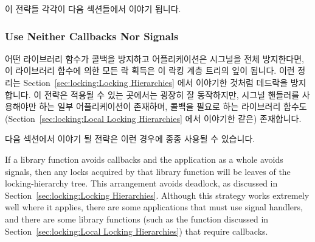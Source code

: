 이 전략들 각각이 다음 섹션들에서 이야기 됩니다.

\subsubsection{Use Neither Callbacks Nor Signals}
\label{sec:locking:Use Neither Callbacks Nor Signals}

어떤 라이브러리 함수가 콜백을 방지하고 어플리케이션은 시그널을 전체 방지한다면,
이 라이브러리 함수에 의한 모든 락 획득은 이 락킹 계층 트리의 잎이 됩니다.
이런 정리는
Section~\ref{sec:locking:Locking Hierarchies} 에서 이야기한 것처럼 데드락을
방지합니다.
이 전략은 적용될 수 있는 곳에서는 굉장히 잘 동작하지만, 시그널 핸들러를
사용해야만 하는 일부 어플리케이션이 존재하며, 콜백을 필요로 하는 라이브러리
함수도
(Section~\ref{sec:locking:Local Locking Hierarchies} 에서 이야기한 
같은) 존재합니다.

다음 섹션에서 이야기 될 전략은 이런 경우에 종종 사용될 수 있습니다.

\iffalse

If a library function avoids callbacks and the application as a whole
avoids signals, then any locks acquired by that library function will
be leaves of the locking-hierarchy tree.
This arrangement avoids deadlock, as discussed in
Section~\ref{sec:locking:Locking Hierarchies}.
Although this strategy works extremely well where it applies,
there are some applications that must use signal handlers,
and there are some library functions (such as the  function
discussed in
Section~\ref{sec:locking:Local Locking Hierarchies})
that require callbacks.


